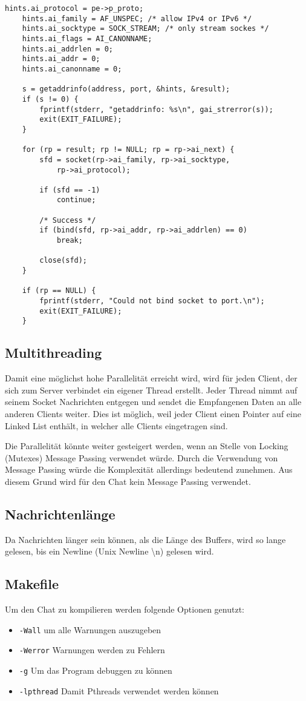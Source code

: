 \documentclass[a4paper]{article}
\begin{document}
\begin{verbatim}
hints.ai_protocol = pe->p_proto;
    hints.ai_family = AF_UNSPEC; /* allow IPv4 or IPv6 */
    hints.ai_socktype = SOCK_STREAM; /* only stream sockes */
    hints.ai_flags = AI_CANONNAME;
    hints.ai_addrlen = 0;
    hints.ai_addr = 0;
    hints.ai_canonname = 0;

    s = getaddrinfo(address, port, &hints, &result);
    if (s != 0) {
        fprintf(stderr, "getaddrinfo: %s\n", gai_strerror(s));
        exit(EXIT_FAILURE);
    }

    for (rp = result; rp != NULL; rp = rp->ai_next) {
        sfd = socket(rp->ai_family, rp->ai_socktype,
            rp->ai_protocol);

        if (sfd == -1)
            continue;

        /* Success */
        if (bind(sfd, rp->ai_addr, rp->ai_addrlen) == 0)
            break;

        close(sfd);
    }

    if (rp == NULL) {
        fprintf(stderr, "Could not bind socket to port.\n");
        exit(EXIT_FAILURE);
    }
\end{verbatim}

\subsection{Multithreading}
Damit eine möglichst hohe Parallelität erreicht wird, wird für jeden Client, der sich zum Server verbindet ein eigener Thread erstellt. Jeder Thread nimmt auf seinem Socket Nachrichten entgegen und sendet die Empfangenen Daten an alle anderen Clients weiter. Dies ist möglich, weil jeder Client einen Pointer auf eine Linked List enthält, in welcher alle Clients eingetragen sind.

Die Parallelität könnte weiter gesteigert werden, wenn an Stelle von Locking (Mutexes) Message Passing verwendet würde. Durch die Verwendung von Message Passing würde die Komplexität allerdings bedeutend zunehmen. Aus diesem Grund wird für den Chat kein Message Passing verwendet.

\subsection{Nachrichtenlänge}
Da Nachrichten länger sein können, als die Länge des Buffers, wird so lange gelesen, bis ein Newline (Unix Newline \textbackslash n) gelesen wird.

\subsection{Makefile}
Um den Chat zu kompilieren werden folgende Optionen genutzt:
\begin{itemize}
    \item \texttt{-Wall} um alle Warnungen auszugeben
    \item \texttt{-Werror} Warnungen werden zu Fehlern
    \item \texttt{-g} Um das Program debuggen zu können
    \item \texttt{-lpthread} Damit Pthreads verwendet werden können
\end{itemize}
\end{document}
